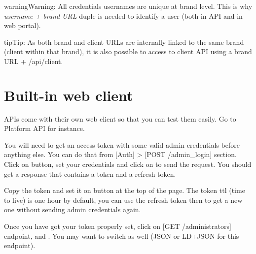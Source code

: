 \documentclass[letterpaper,10pt,english]{sphinxmanual}
\begin{document}
\begin{notice}{warning}{Warning:}
All credentials usernames are unique at brand level. This is why \emph{username + brand URL} duple is needed to
identify a user (both in API and in web portal).
\end{notice}

\begin{notice}{tip}{Tip:}
As both brand and client URLs are internally linked to the same brand (client within that brand), it is also
possible to access to client API using a brand URL + /api/client.
\end{notice}


\chapter{Built-in web client}
\label{api_rest/web_client:built-in-web-client}\label{api_rest/web_client::doc}
APIs come with their own web client so that you can test them easily. Go to Platform API for instance.


You will need to get an access token with some valid admin credentials before anything else. You can do that from {[}Auth{]} \textgreater{} {[}POST /admin\_login{]} section. Click on  button, set your credentials and click on  to send the request. You should get a response that contains a token and a refresh token.


Copy the token and set it on  button at the top of the page. The token ttl (time to live) is one hour by default, you can use the refresh token then to get a new one without sending admin credentials again.

Once you have got your token properly set, click on {[}GET /administrators{]} endpoint,  and . You may want to switch  as well (JSON or LD+JSON for this endpoint).

\end{document}
